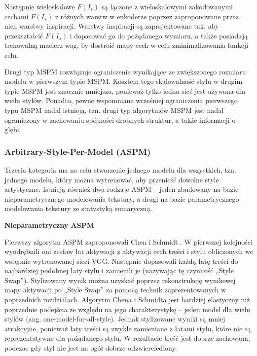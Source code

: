 \documentclass[12pt]{article}
\begin{document}
Następnie wieloskalowe $F(I_s)$ są łączone z wieloskalowymi zakodowanymi cechami $F(I_s)$ z różnych warstw w enkoderze poprzez zaproponowane przez nich warstwy inspiracji. Warstwy inspiracji są zaprojektowane tak, aby przekształcić $F(I_s)$ i dopasować go do pożądanego wymiaru, a także posiadają trenowalną macierz wag, by dostroić mapy cech w celu zminimalizowania funkcji celu.

Drugi typ MSPM rozwiązuje ograniczenie wynikające ze zwiększonego rozmiaru modelu w pierwszym typie MSPM. Kosztem tego skalowalność stylu w drugim typie MSPM jest znacznie mniejsza, ponieważ tylko jedna sieć jest używana dla wielu stylów. Ponadto, pewne wspomniane wcześniej ograniczenia pierwszego typu MSPM nadal istnieją, tzn. drugi typ algorytmów MSPM jest nadal ograniczony w zachowaniu spójności drobnych struktur, a także informacji o głębi.

\subsubsection{Arbitrary-Style-Per-Model (ASPM)}

\indent

Trzecia kategoria ma na celu stworzenie jednego modelu dla wszystkich, tzn. jednego modelu, który można wytrenować, aby przenieść dowolne style artystyczne. Istnieją również dwa rodzaje ASPM – jeden zbudowany na bazie nieparametrycznego modelowania tekstury, a drugi na bazie parametrycznego modelowania tekstury ze statystyką sumaryczną.

\noindent\textbf{Nieparametryczny ASPM}

Pierwszy algorytm ASPM zaproponowali Chen i Schmidt \cite{47}. W pierwszej kolejności wyodrębnili oni zestaw łat aktywacji z aktywacji cech treści i stylu obliczonych we wstępnie wytrenowanej sieci VGG. Następnie dopasowali każdą łatę treści do najbardziej podobnej łaty stylu i zamienili je (nazywając tę czynność „Style Swap”). Stylizowany wynik można uzyskać poprzez rekonstrukcję wynikowej mapy aktywacji po „Style Swap” za pomocą technik zaprezentowanych w poprzednich rozdziałach. Algorytm Chena i Schmidta jest bardziej elastyczny niż poprzednie podejścia ze względu na jego charakterystykę – jeden model dla wielu stylów (ang. one-model-for-all-style). Jednak stylizowane wyniki są mniej atrakcyjne, ponieważ łaty treści są zwykle zamieniane z łatami stylu, które nie są reprezentatywne dla pożądanego stylu. W rezultacie treść jest dobrze zachowana, podczas gdy styl nie jest na ogół dobrze odzwierciedlony.
    
\end{document}
